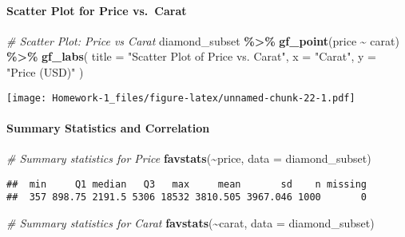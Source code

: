 \documentclass[
]{article}
\newenvironment{Shaded}{\begin{snugshade}}{\end{snugshade}}
\newcommand{\AttributeTok}[1]{\textcolor[rgb]{0.13,0.29,0.53}{#1}}
\newcommand{\CommentTok}[1]{\textcolor[rgb]{0.56,0.35,0.01}{\textit{#1}}}
\newcommand{\FunctionTok}[1]{\textcolor[rgb]{0.13,0.29,0.53}{\textbf{#1}}}
\newcommand{\NormalTok}[1]{#1}
\newcommand{\SpecialCharTok}[1]{\textcolor[rgb]{0.81,0.36,0.00}{\textbf{#1}}}
\newcommand{\StringTok}[1]{\textcolor[rgb]{0.31,0.60,0.02}{#1}}
\begin{document}
\paragraph{Scatter Plot for Price
vs.~Carat}\label{scatter-plot-for-price-vs.-carat}

\begin{Shaded}
\begin{Highlighting}[]
\CommentTok{\# Scatter Plot: Price vs Carat}
\NormalTok{diamond\_subset }\SpecialCharTok{\%\textgreater{}\%}
  \FunctionTok{gf\_point}\NormalTok{(price }\SpecialCharTok{\textasciitilde{}}\NormalTok{ carat) }\SpecialCharTok{\%\textgreater{}\%}
  \FunctionTok{gf\_labs}\NormalTok{(}
    \AttributeTok{title =} \StringTok{"Scatter Plot of Price vs. Carat"}\NormalTok{,}
    \AttributeTok{x =} \StringTok{"Carat"}\NormalTok{,}
    \AttributeTok{y =} \StringTok{"Price (USD)"}
\NormalTok{  )}
\end{Highlighting}
\end{Shaded}

\texttt{[image: Homework-1\_files/figure-latex/unnamed-chunk-22-1.pdf]}

\paragraph{Summary Statistics and
Correlation}\label{summary-statistics-and-correlation}

\begin{Shaded}
\begin{Highlighting}[]
\CommentTok{\# Summary statistics for Price}
\FunctionTok{favstats}\NormalTok{(}\SpecialCharTok{\textasciitilde{}}\NormalTok{price, }\AttributeTok{data =}\NormalTok{ diamond\_subset)}
\end{Highlighting}
\end{Shaded}

\begin{verbatim}
##  min     Q1 median   Q3   max     mean       sd    n missing
##  357 898.75 2191.5 5306 18532 3810.505 3967.046 1000       0
\end{verbatim}

\begin{Shaded}
\begin{Highlighting}[]
\CommentTok{\# Summary statistics for Carat}
\FunctionTok{favstats}\NormalTok{(}\SpecialCharTok{\textasciitilde{}}\NormalTok{carat, }\AttributeTok{data =}\NormalTok{ diamond\_subset)}
\end{Highlighting}
\end{Shaded}
\end{document}
